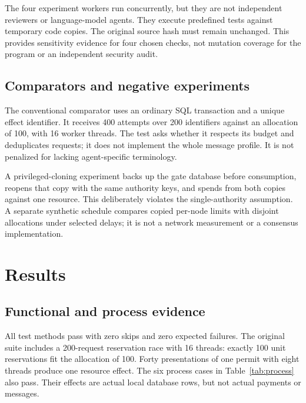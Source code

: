 \documentclass[10pt,journal,a4paper]{IEEEtran}
\begin{document}
The four experiment workers run concurrently, but they are not independent reviewers or language-model agents. They execute predefined tests against temporary code copies. The original source hash must remain unchanged. This provides sensitivity evidence for four chosen checks, not mutation coverage for the program or an independent security audit.

\subsection{Comparators and negative experiments}
The conventional comparator uses an ordinary SQL transaction and a unique effect identifier. It receives 400 attempts over 200 identifiers against an allocation of 100, with 16 worker threads. The test asks whether it respects its budget and deduplicates requests; it does not implement the whole message profile. It is not penalized for lacking agent-specific terminology.

A privileged-cloning experiment backs up the gate database before consumption, reopens that copy with the same authority keys, and spends from both copies against one resource. This deliberately violates the single-authority assumption. A separate synthetic schedule compares copied per-node limits with disjoint allocations under selected delays; it is not a network measurement or a consensus implementation.

\section{Results}
\subsection{Functional and process evidence}
All \UnitCount{} test methods pass with zero skips and zero expected failures. The original suite includes a 200-request reservation race with 16 threads: exactly 100 unit reservations fit the allocation of 100. Forty presentations of one permit with eight threads produce one resource effect. The six process cases in Table~\ref{tab:process} also pass. Their effects are actual local database rows, but not actual payments or messages.
\end{document}
